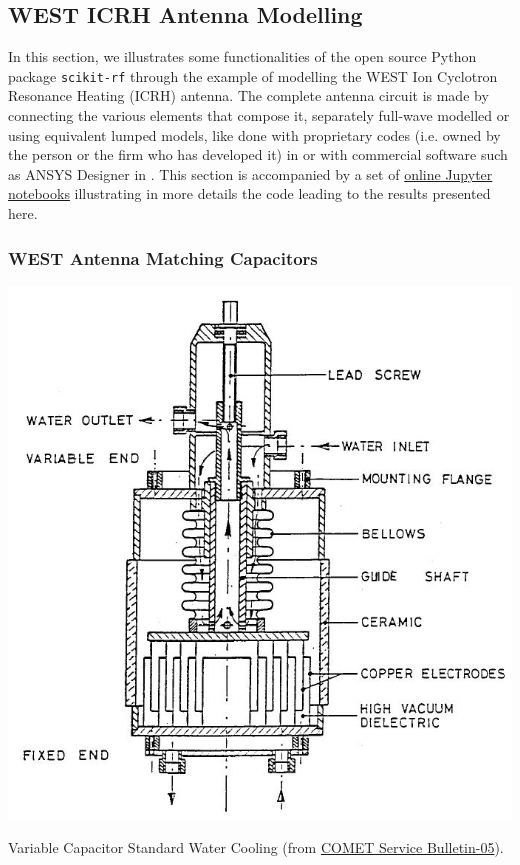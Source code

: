 \subsection{WEST ICRH Antenna Modelling}\label{sec:WEST_ICRH_antenna_modelling}
In this section, we illustrates some functionalities of the open source Python package \texttt{scikit-rf}  through the example of modelling the WEST Ion Cyclotron Resonance Heating (ICRH) antenna. The complete antenna circuit is made by connecting the various elements that compose it, separately full-wave modelled or using equivalent lumped models, like done with proprietary codes (i.e. owned by the person or the firm who has developed it)  in  or with commercial software such as ANSYS Designer in . This section is accompanied by a set of  \href{https://doi.org/10.5281/zenodo.2668370}{online Jupyter notebooks} illustrating in more details the code leading to the results presented here.


\subsubsection{WEST Antenna Matching Capacitors}
\begin{marginfigure}
	\centering
	\includegraphics[width=1.0\linewidth]{figures/chap3/WEST_ICRH/COMET_capacitor}
	\caption{Variable Capacitor Standard Water Cooling (from \href{https://www.comet-pct.com/getmedia/525c5fbc-2356-4c2e-8e62-3f8a3c3da16c/SB-05_Variable_Capacitor_Water_Cooling.aspx}{COMET Service Bulletin-05}).	
}
	\label{fig:cometcapacitor}
\end{marginfigure}

